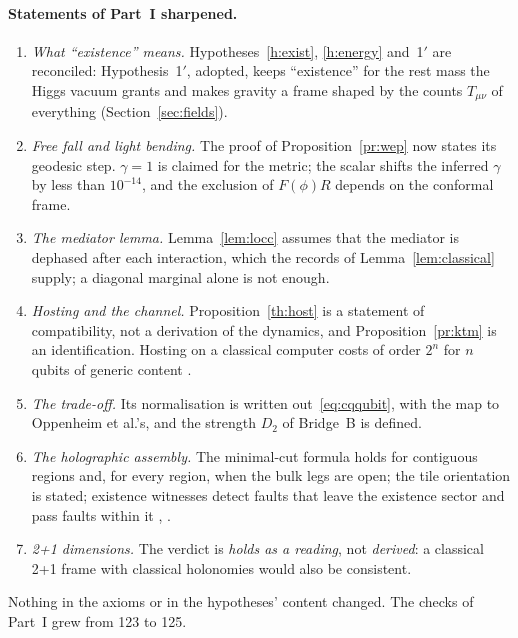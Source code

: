 \paragraph{Statements of Part~I sharpened.}
\begin{enumerate}
\item \emph{What ``existence'' means.} Hypotheses~\ref{h:exist}, \ref{h:energy} and~1$'$ are reconciled: Hypothesis~1$'$, adopted, keeps
``existence'' for the rest mass the Higgs vacuum grants and makes gravity a frame shaped by the counts $T_{\mu\nu}$ of everything
(Section~\ref{sec:fields}).
\item \emph{Free fall and light bending.} The proof of Proposition~\ref{pr:wep} now states its geodesic step. $\gamma=1$ is claimed for the
metric; the scalar shifts the inferred $\gamma$ by less than $10^{-14}$, and the exclusion of $F(\phi)R$ depends on the conformal frame.
\item \emph{The mediator lemma.} Lemma~\ref{lem:locc} assumes that the mediator is dephased after each interaction, which the records of
Lemma~\ref{lem:classical} supply; a diagonal marginal alone is not enough.
\item \emph{Hosting and the channel.} Proposition~\ref{th:host} is a statement of compatibility, not a derivation of the dynamics, and
Proposition~\ref{pr:ktm} is an identification. Hosting on a classical computer costs of order $2^n$ for $n$ qubits of generic content
.
\item \emph{The trade-off.} Its normalisation is written out~\eqref{eq:cqqubit}, with the map to Oppenheim et al.'s, and the strength
$D_2$ of Bridge~B is defined.
\item \emph{The holographic assembly.} The minimal-cut formula holds for contiguous regions and, for every region, when the bulk legs are
open; the tile orientation is stated; existence witnesses detect faults that leave the existence sector and pass faults within it
, .
\item \emph{2+1 dimensions.} The verdict is \emph{holds as a reading}, not \emph{derived}: a classical 2+1 frame with classical holonomies
would also be consistent.
\end{enumerate}
Nothing in the axioms or in the hypotheses' content changed. The checks of Part~I grew from 123 to 125.

